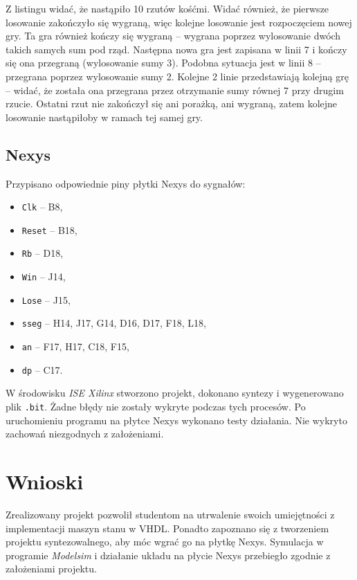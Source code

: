 \documentclass[a4paper,11pt,fleqn]{article}
\begin{document}


Z listingu widać, że nastąpiło 10 rzutów kośćmi. Widać również, że pierwsze losowanie zakończyło się wygraną, więc kolejne losowanie jest rozpoczęciem nowej gry. Ta gra również kończy się wygraną -- wygrana poprzez wylosowanie dwóch takich samych sum pod rząd. Następna nowa gra jest zapisana w linii 7 i kończy się ona przegraną (wylosowanie sumy 3). Podobna sytuacja jest w linii 8 -- przegrana poprzez wylosowanie sumy 2. Kolejne 2 linie przedstawiają kolejną grę -- widać, że została ona przegrana przez otrzymanie sumy równej 7 przy drugim rzucie. Ostatni rzut nie zakończył się ani porażką, ani wygraną, zatem kolejne losowanie nastąpiłoby w ramach tej samej gry.

\subsection{Nexys}

Przypisano odpowiednie piny płytki Nexys do sygnałów:
\begin{itemize}
\item \texttt{Clk} -- B8,
\item \texttt{Reset} -- B18,
\item \texttt{Rb} -- D18,
\item \texttt{Win} -- J14,
\item \texttt{Lose} -- J15,
\item \texttt{sseg} -- H14, J17, G14, D16, D17, F18, L18,
\item \texttt{an} -- F17, H17, C18, F15,
\item \texttt{dp} -- C17.
\end{itemize}

W środowisku \textit{ISE Xilinx} stworzono projekt, dokonano syntezy i wygenerowano plik \texttt{.bit}. Żadne błędy nie zostały wykryte podczas tych procesów. 
Po uruchomieniu programu na płytce Nexys wykonano testy działania. Nie wykryto zachowań niezgodnych z założeniami.

\section{Wnioski}

Zrealizowany projekt pozwolił studentom na utrwalenie swoich umiejętności z implementacji maszyn stanu w VHDL. Ponadto zapoznano się z tworzeniem projektu syntezowalnego, aby móc wgrać go na płytkę Nexys. Symulacja w programie \textit{Modelsim} i działanie układu na płycie Nexys przebiegło zgodnie z założeniami projektu.
\end{document}
